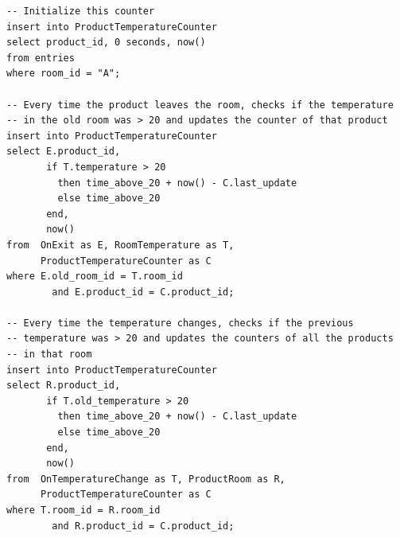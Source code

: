 \documentclass[a4,11pt]{report}
\begin{document}
\begin{lstlisting}
-- Initialize this counter
insert into ProductTemperatureCounter
select product_id, 0 seconds, now()
from entries
where room_id = "A";

-- Every time the product leaves the room, checks if the temperature
-- in the old room was > 20 and updates the counter of that product
insert into ProductTemperatureCounter
select E.product_id,
       if T.temperature > 20
         then time_above_20 + now() - C.last_update
         else time_above_20
       end,
       now()
from  OnExit as E, RoomTemperature as T,
      ProductTemperatureCounter as C
where E.old_room_id = T.room_id
        and E.product_id = C.product_id;

-- Every time the temperature changes, checks if the previous
-- temperature was > 20 and updates the counters of all the products
-- in that room
insert into ProductTemperatureCounter
select R.product_id,
       if T.old_temperature > 20
         then time_above_20 + now() - C.last_update
         else time_above_20
       end,
       now()
from  OnTemperatureChange as T, ProductRoom as R,
      ProductTemperatureCounter as C
where T.room_id = R.room_id
        and R.product_id = C.product_id;
\end{lstlisting}
\end{document}

